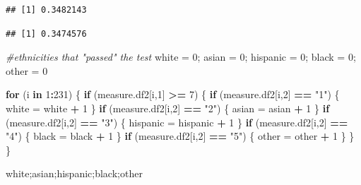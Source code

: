 \documentclass[]{article}
\newenvironment{Shaded}{\begin{snugshade}}{\end{snugshade}}
\newcommand{\CommentTok}[1]{\textcolor[rgb]{0.56,0.35,0.01}{\textit{#1}}}
\newcommand{\ControlFlowTok}[1]{\textcolor[rgb]{0.13,0.29,0.53}{\textbf{#1}}}
\newcommand{\DecValTok}[1]{\textcolor[rgb]{0.00,0.00,0.81}{#1}}
\newcommand{\NormalTok}[1]{#1}
\newcommand{\OperatorTok}[1]{\textcolor[rgb]{0.81,0.36,0.00}{\textbf{#1}}}
\newcommand{\StringTok}[1]{\textcolor[rgb]{0.31,0.60,0.02}{#1}}
\begin{document}
\begin{verbatim}
## [1] 0.3482143
\end{verbatim}

\begin{verbatim}
## [1] 0.3474576
\end{verbatim}

\begin{Shaded}
\begin{Highlighting}[]
\CommentTok{#ethnicities that "passed" the test}
\NormalTok{white =}\StringTok{ }\DecValTok{0}\NormalTok{; asian =}\StringTok{ }\DecValTok{0}\NormalTok{; hispanic =}\StringTok{ }\DecValTok{0}\NormalTok{; black =}\StringTok{ }\DecValTok{0}\NormalTok{; other =}\StringTok{ }\DecValTok{0}

\ControlFlowTok{for}\NormalTok{ (i }\ControlFlowTok{in} \DecValTok{1}\OperatorTok{:}\DecValTok{231}\NormalTok{)}
\NormalTok{\{}
  \ControlFlowTok{if}\NormalTok{ (measure.df2[i,}\DecValTok{1}\NormalTok{] }\OperatorTok{>=}\StringTok{ }\DecValTok{7}\NormalTok{)}
\NormalTok{  \{}
    \ControlFlowTok{if}\NormalTok{ (measure.df2[i,}\DecValTok{2}\NormalTok{] }\OperatorTok{==}\StringTok{ "1"}\NormalTok{)}
\NormalTok{    \{}
\NormalTok{      white =}\StringTok{ }\NormalTok{white }\OperatorTok{+}\StringTok{ }\DecValTok{1}
\NormalTok{    \}}
    \ControlFlowTok{if}\NormalTok{ (measure.df2[i,}\DecValTok{2}\NormalTok{] }\OperatorTok{==}\StringTok{ "2"}\NormalTok{)}
\NormalTok{    \{}
\NormalTok{      asian =}\StringTok{ }\NormalTok{asian }\OperatorTok{+}\StringTok{ }\DecValTok{1}
\NormalTok{    \}}
    \ControlFlowTok{if}\NormalTok{ (measure.df2[i,}\DecValTok{2}\NormalTok{] }\OperatorTok{==}\StringTok{ "3"}\NormalTok{) }
\NormalTok{    \{}
\NormalTok{      hispanic =}\StringTok{ }\NormalTok{hispanic }\OperatorTok{+}\StringTok{ }\DecValTok{1}
\NormalTok{    \}}
    \ControlFlowTok{if}\NormalTok{ (measure.df2[i,}\DecValTok{2}\NormalTok{] }\OperatorTok{==}\StringTok{ "4"}\NormalTok{)}
\NormalTok{    \{}
\NormalTok{      black =}\StringTok{ }\NormalTok{black }\OperatorTok{+}\StringTok{ }\DecValTok{1}
\NormalTok{    \}}
    \ControlFlowTok{if}\NormalTok{ (measure.df2[i,}\DecValTok{2}\NormalTok{] }\OperatorTok{==}\StringTok{ "5"}\NormalTok{) }
\NormalTok{    \{}
\NormalTok{      other =}\StringTok{ }\NormalTok{other }\OperatorTok{+}\StringTok{ }\DecValTok{1}
\NormalTok{    \}}
\NormalTok{  \}}
\NormalTok{\}}

\NormalTok{white;asian;hispanic;black;other}
\end{Highlighting}
\end{Shaded}
\end{document}
